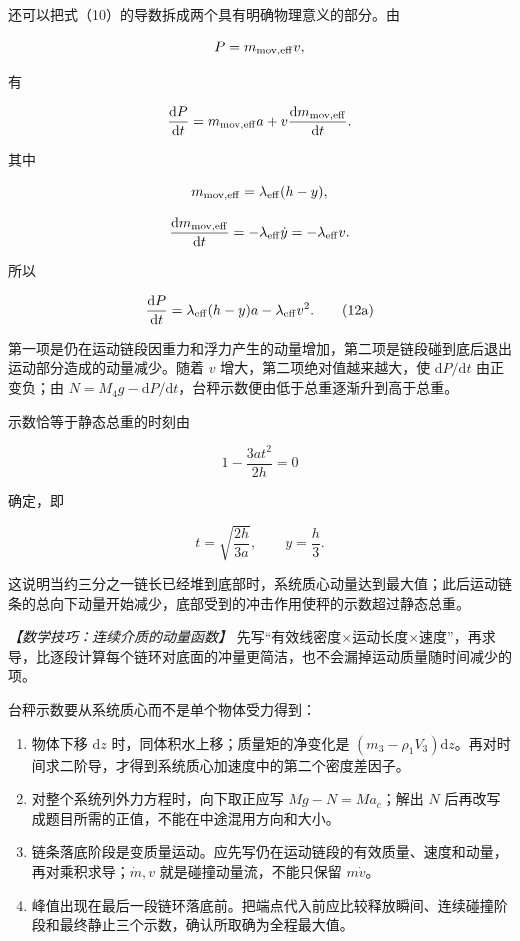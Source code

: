 \documentclass[12pt,a4paper,UTF8]{ctexart}
\newcommand{\tightlist}{\setlength{\itemsep}{0pt}\setlength{\parskip}{0pt}}
\begin{document}
还可以把式（10）的导数拆成两个具有明确物理意义的部分。由

\[P=m_{\rm mov,eff}v,\]

有

\[\frac{\mathrm dP}{\mathrm dt}
=m_{\rm mov,eff}a+v\frac{\mathrm dm_{\rm mov,eff}}{\mathrm dt}.\]

其中

\[m_{\rm mov,eff}=\lambda_{\rm eff}(h-y),\]

\[\frac{\mathrm dm_{\rm mov,eff}}{\mathrm dt}
=-\lambda_{\rm eff}\dot y
=-\lambda_{\rm eff}v.\]

所以

\[\frac{\mathrm dP}{\mathrm dt}
=\lambda_{\rm eff}(h-y)a-\lambda_{\rm eff}v^2. \tag{12a}\]

第一项是仍在运动链段因重力和浮力产生的动量增加，第二项是链段碰到底后退出运动部分造成的动量减少。随着
\(v\) 增大，第二项绝对值越来越大，使 \(\mathrm dP/\mathrm dt\)
由正变负；由
\(N=M_4g-\mathrm dP/\mathrm dt\)，台秤示数便由低于总重逐渐升到高于总重。

示数恰等于静态总重的时刻由

\[1-\frac{3at^2}{2h}=0\]

确定，即

\[t=\sqrt{\frac{2h}{3a}},\qquad y=\frac h3.\]

这说明当约三分之一链长已经堆到底部时，系统质心动量达到最大值；此后运动链条的总向下动量开始减少，底部受到的冲击作用使秤的示数超过静态总重。

\emph{【数学技巧：连续介质的动量函数】}
先写``有效线密度×运动长度×速度''，再求导，比逐段计算每个链环对底面的冲量更简洁，也不会漏掉运动质量随时间减少的项。

台秤示数要从系统质心而不是单个物体受力得到：

\begin{enumerate}
\def\labelenumi{\arabic{enumi}.}
\tightlist
\item
  物体下移 \(\mathrm dz\) 时，同体积水上移；质量矩的净变化是
  \((m_3-\rho_1V_3)\mathrm dz\)。再对时间求二阶导，才得到系统质心加速度中的第二个密度差因子。
\item
  对整个系统列外力方程时，向下取正应写 \(Mg-N=Ma_c\)；解出 \(N\)
  后再改写成题目所需的正值，不能在中途混用方向和大小。
\item
  链条落底阶段是变质量运动。应先写仍在运动链段的有效质量、速度和动量，再对乘积求导；\(\dot m,v\)
  就是碰撞动量流，不能只保留 \(m\dot v\)。
\item
  峰值出现在最后一段链环落底前。把端点代入前应比较释放瞬间、连续碰撞阶段和最终静止三个示数，确认所取确为全程最大值。
\end{enumerate}
\end{document}
